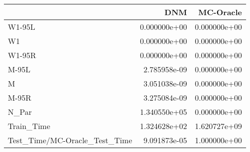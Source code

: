 \begin{tabular}{lrr}
\toprule
{} &           DNM &     MC-Oracle \\
\midrule
W1-95L                        &  0.000000e+00 &  0.000000e+00 \\
W1                            &  0.000000e+00 &  0.000000e+00 \\
W1-95R                        &  0.000000e+00 &  0.000000e+00 \\
M-95L                         &  2.785958e-09 &  0.000000e+00 \\
M                             &  3.051038e-09 &  0.000000e+00 \\
M-95R                         &  3.275084e-09 &  0.000000e+00 \\
N\_Par                         &  1.340550e+05 &  0.000000e+00 \\
Train\_Time                    &  1.324628e+02 &  1.620727e+09 \\
Test\_Time/MC-Oracle\_Test\_Time &  9.091873e-05 &  1.000000e+00 \\
\bottomrule
\end{tabular}
